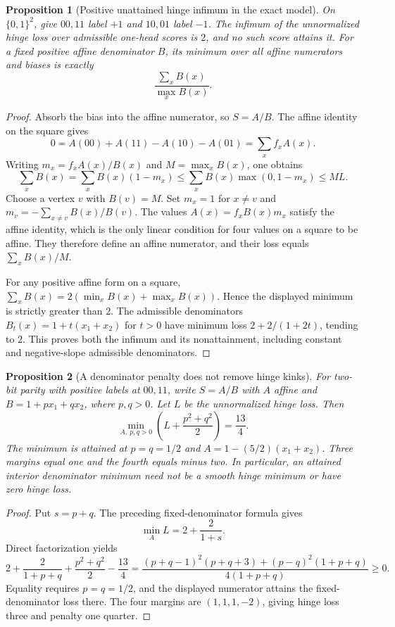 \documentclass[11pt]{article}
\newtheorem{proposition}{Proposition}
\begin{document}
\begin{proposition}[Positive unattained hinge infimum in the exact model]
On $\{0,1\}^2$, give $00,11$ label $+1$ and $10,01$ label $-1$.
The infimum of the unnormalized hinge loss over admissible one-head
scores is $2$, and no such score attains it.
For a fixed positive affine denominator $B$, its minimum over all
affine numerators and biases is exactly
\[
 \frac{\sum_x B(x)}{\max_x B(x)}.
\]
\end{proposition}
\begin{proof}
Absorb the bias into the affine numerator, so $S=A/B$.
The affine identity on the square gives
\[
 0=A(00)+A(11)-A(10)-A(01)=\sum_x f_x A(x).
\]
Writing $m_x=f_xA(x)/B(x)$ and $M=\max_xB(x)$, one obtains
\[
 \sum_x B(x)
 =\sum_xB(x)(1-m_x)
 \le\sum_xB(x)\max(0,1-m_x)
 \le M L.
\]
Choose a vertex $v$ with $B(v)=M$. Set $m_x=1$ for $x\ne v$ and
$m_v=-\sum_{x\ne v}B(x)/B(v)$. The values $A(x)=f_xB(x)m_x$
satisfy the affine identity, which is the only linear condition for
four values on a square to be affine. They therefore define an
affine numerator, and their loss equals $\sum_xB(x)/M$.

For any positive affine form on a square,
$\sum_xB(x)=2(\min_xB(x)+\max_xB(x))$. Hence the displayed minimum
is strictly greater than $2$. The admissible denominators
$B_t(x)=1+t(x_1+x_2)$ for $t>0$ have minimum loss
$2+2/(1+2t)$, tending to $2$. This proves both the infimum and its
nonattainment, including constant and negative-slope admissible
denominators.
\end{proof}

\begin{proposition}[A denominator penalty does not remove hinge kinks]
For two-bit parity with positive labels at $00,11$, write
$S=A/B$ with $A$ affine and $B=1+px_1+qx_2$, where $p,q>0$.
Let $L$ be the unnormalized hinge loss. Then
\[
 \min_{A,\ p,q>0}\left(L+\frac{p^2+q^2}{2}\right)=\frac{13}{4}.
\]
The minimum is attained at $p=q=1/2$ and
$A=1-(5/2)(x_1+x_2)$. Three margins equal one and the fourth
equals minus two. In particular, an attained interior denominator
minimum need not be a smooth hinge minimum or have zero hinge loss.
\end{proposition}
\begin{proof}
Put $s=p+q$. The preceding fixed-denominator formula gives
\[
 \min_A L=2+\frac{2}{1+s}.
\]
Direct factorization yields
\[
 2+\frac{2}{1+p+q}+\frac{p^2+q^2}{2}-\frac{13}{4}
 =\frac{(p+q-1)^2(p+q+3)+(p-q)^2(1+p+q)}{4(1+p+q)}
 \geq0.
\]
Equality requires $p=q=1/2$, and the displayed numerator attains
the fixed-denominator loss there. The four margins are
$(1,1,1,-2)$, giving hinge loss three and penalty one quarter.
\end{proof}
\end{document}
